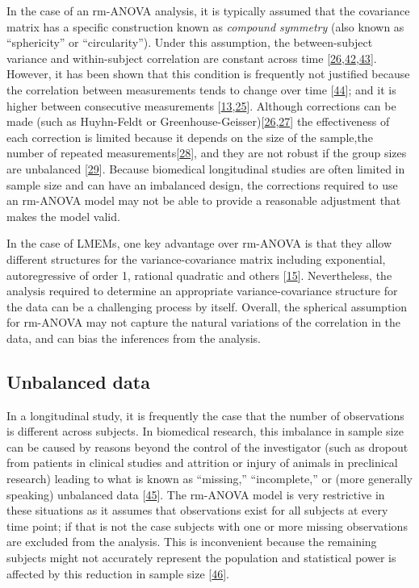 \documentclass[
]{article}
\begin{document}
In the case of an rm-ANOVA analysis, it is typically assumed that the covariance matrix has a specific construction known as \emph{compound symmetry} (also known as ``sphericity'' or ``circularity''). Under this assumption, the between-subject variance and within-subject correlation are constant across time {[}\protect\hyperlink{ref-huynh1976}{26},\protect\hyperlink{ref-weiss2005}{42},\protect\hyperlink{ref-geisser1958}{43}{]}. However, it has been shown that this condition is frequently not justified because the correlation between measurements tends to change over time {[}\protect\hyperlink{ref-maxwell2017}{44}{]}; and it is higher between consecutive measurements {[}\protect\hyperlink{ref-gueorguieva2004}{13},\protect\hyperlink{ref-ugrinowitsch2004}{25}{]}. Although corrections can be made (such as Huyhn-Feldt or Greenhouse-Geisser){[}\protect\hyperlink{ref-huynh1976}{26},\protect\hyperlink{ref-greenhouse1959}{27}{]} the effectiveness of each correction is limited because it depends on the size of the sample,the number of repeated measurements{[}\protect\hyperlink{ref-haverkamp2017}{28}{]}, and they are not robust if the group sizes are unbalanced {[}\protect\hyperlink{ref-keselman2001}{29}{]}. Because biomedical longitudinal studies are often limited in sample size and can have an imbalanced design, the corrections required to use an rm-ANOVA model may not be able to provide a reasonable adjustment that makes the model valid.

In the case of LMEMs, one key advantage over rm-ANOVA is that they allow different structures for the variance-covariance matrix including exponential, autoregressive of order 1, rational quadratic and others {[}\protect\hyperlink{ref-pinheiro2006}{15}{]}. Nevertheless, the analysis required to determine an appropriate variance-covariance structure for the data can be a challenging process by itself. Overall, the spherical assumption for rm-ANOVA may not capture the natural variations of the correlation in the data, and can bias the inferences from the analysis.

\hypertarget{unbalanced-data}{%
\subsection{Unbalanced data}\label{unbalanced-data}}

In a longitudinal study, it is frequently the case that the number of observations is different across subjects. In biomedical research, this imbalance in sample size can be caused by reasons beyond the control of the investigator (such as dropout from patients in clinical studies and attrition or injury of animals in preclinical research) leading to what is known as ``missing,'' ``incomplete,'' or (more generally speaking) unbalanced data {[}\protect\hyperlink{ref-molenberghs2004}{45}{]}. The rm-ANOVA model is very restrictive in these situations as it assumes that observations exist for all subjects at every time point; if that is not the case subjects with one or more missing observations are excluded from the analysis. This is inconvenient because the remaining subjects might not accurately represent the population and statistical power is affected by this reduction in sample size {[}\protect\hyperlink{ref-ma2012}{46}{]}.
\end{document}
